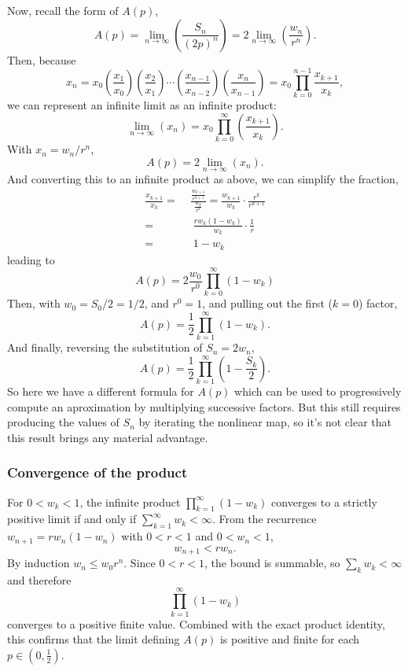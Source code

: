 \documentclass[11pt,a4paper]{article}
\theoremstyle{plain}
\theoremstyle{definition}
\begin{document}
\noindent
Now, recall the form of $A(p)$,
$$A(p) = \lim_{n\to\infty} \left(\frac{S_n}{(2p)^n}\right) = 2\lim_{n\to\infty}\left(\frac{w_n}{r^n}\right).$$
Then, because
$$x_n = x_0\left(\frac{x_{1}}{x_{0}}\right)\left(\frac{x_{2}}{x_{1}}\right)\cdots\left(\frac{x_{n-1}}{x_{n-2}}\right)\left(\frac{x_{n}}{x_{n-1}}\right) = x_0\prod^{n-1}_{k=0} \frac{x_{k+1}}{x_k},$$
we can represent an infinite limit as an infinite product: 
$$\lim_{n\to\infty}(x_n) = x_0\prod^\infty_{k=0}\left(\frac{x_{k+1}}{x_k}\right).$$
With $x_n = w_n/r^n$,
$$A(p) = 2\lim_{n\to\infty}\left(x_n\right).$$
And converting this to an infinite product as above, we can simplify the fraction,
\begin{align*}
\frac{x_{k+1}}{x_k} =&\; \frac{\frac{w_{k+1}}{r^{k+1}}}{\frac{w_k}{r^k}} = \frac{w_{k+1}}{w_k}\cdot\frac{r^k}{r^{k+1}}\\
=& \;\;\frac{rw_k(1-w_k)}{w_k}\cdot\frac{1}{r}\\ 
=& \;\; 1-w_k
\end{align*}
leading to
$$A(p) = 2\frac{w_0}{r^0}\prod^\infty_{k=0}(1-w_k)$$
Then, with $w_0 = S_0/2 = 1/2$, and $r^0 = 1$, and pulling out the first ($k=0$) factor,
$$A(p) = \frac{1}{2}\prod^\infty_{k=1}\left(1-w_k\right).$$
And finally, reversing the substitution of $S_n = 2w_n$,
\begin{equation}
\label{eq:prodFormula}
A(p) = \frac{1}{2}\prod_{k=1}^{\infty}\left(1-\frac{S_k}{2}\right).
\end{equation}
So here we have a different formula for $A(p)$ which can be used to progressively compute an aproximation by multiplying successive factors. But this still requires producing the values of $S_n$ by iterating the nonlinear map, so it's not clear that this result brings any material advantage. 


\subsubsection{Convergence of the product}
For $0<w_k<1$, the infinite product $\prod_{k=1}^{\infty}(1-w_k)$ converges to a strictly positive limit if and only if $\sum_{k=1}^{\infty}w_k<\infty$.
From the recurrence $w_{n+1}=r w_n(1-w_n)$ with $0<r<1$ and $0<w_n<1$,
\[
w_{n+1}<r w_n.
\]
By induction $w_n\le w_0 r^n$. Since $0<r<1$, the bound is summable, so $\sum_k w_k<\infty$ and therefore
\[
\prod_{k=1}^{\infty}(1-w_k)
\]
converges to a positive finite value. Combined with the exact product identity, this confirms that the limit defining $A(p)$ is positive and finite for each $p\in(0,\tfrac12)$.
\end{document}

